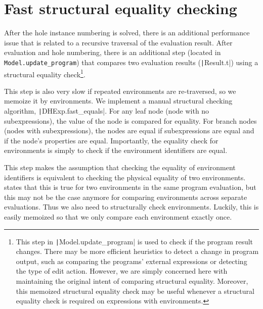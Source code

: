 \section{Fast structural equality checking}
\label{sec:fast-equals}

After the hole instance numbering is solved, there is an additional performance issue that is related to a recursive traversal of the evaluation result. After evaluation and hole numbering, there is an additional step (located in \texttt{Model.update_program}) that compares two evaluation results (\texttt|Result.t|) using a structural equality check\footnote{This step in \texttt|Model.update_program| is used to check if the program result changes. There may be more efficient heuristics to detect a change in program output, such as comparing the programs' external expressions or detecting the type of edit action. However, we are simply concerned here with maintaining the original intent of comparing structural equality. Moreover, this memoized structural equality check may be useful whenever a structural equality check is required on expressions with environments.}.

This step is also very slow if repeated environments are re-traversed, so we memoize it by environments. We implement a manual structural checking algorithm, \texttt|DHExp.fast_equals|. For any leaf node (node with no subexpressions), the value of the node is compared for equality. For branch nodes (nodes with subexpressions), the nodes are equal if subexpressions are equal and if the node's properties are equal. Importantly, the equality check for environments is simply to check if the environment identifiers are equal.

This step makes the assumption that checking the equality of environment identifiers is equivalent to checking the physical equality of two environments.  states that this is true for two environments in the same program evaluation, but this may not be the case anymore for comparing environments across separate evaluations. Thus we also need to structurally check environments. Luckily, this is easily memoized so that we only compare each environment exactly once.


